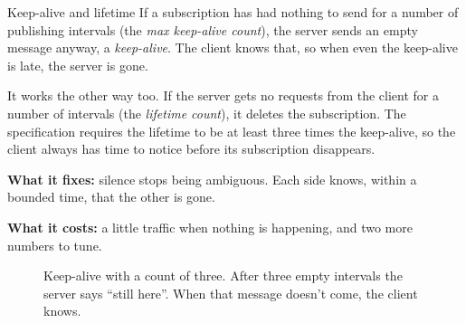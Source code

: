 \begin{concept}{Keep-alive and lifetime}
If a subscription has had nothing to send for a number of publishing intervals
(the \emph{max keep-alive count}), the server sends an empty message anyway, a
\emph{keep-alive}. The client knows that, so when even the keep-alive is late,
the server is gone.

It works the other way too. If the server gets no requests from the client for
a number of intervals (the \emph{lifetime count}), it deletes the subscription.
The specification requires the lifetime to be at least three times the
keep-alive, so the client always has time to notice before its subscription
disappears.

\textbf{What it fixes:} silence stops being ambiguous. Each side knows, within a
bounded time, that the other is gone.

\textbf{What it costs:} a little traffic when nothing is happening, and two
more numbers to tune.
\end{concept}

\begin{figure}[htbp]
\centering
{}
\caption{Keep-alive with a count of three. After three empty intervals the
server says ``still here''. When that message doesn't come, the client knows.}
\end{figure}

